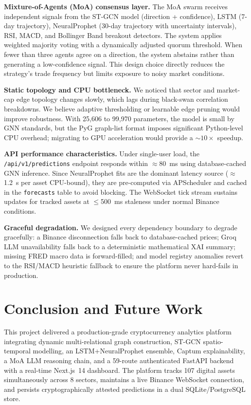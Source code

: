 \documentclass{article}
\begin{document}
\textbf{Mixture-of-Agents (MoA) consensus layer.} The MoA swarm receives independent signals from the ST-GCN model (direction + confidence), LSTM (7-day trajectory), NeuralProphet (30-day trajectory with uncertainty intervals), RSI, MACD, and Bollinger Band breakout detectors. The system applies weighted majority voting with a dynamically adjusted quorum threshold. When fewer than three agents agree on a direction, the system abstains rather than generating a low-confidence signal. This design choice directly reduces the strategy's trade frequency but limits exposure to noisy market conditions.

\textbf{Static topology and CPU bottleneck.} We noticed that sector and market-cap edge topology changes slowly, which lags during black-swan correlation breakdowns. We believe adaptive thresholding or learnable edge pruning would improve robustness. With 25,606 to 99,970 parameters, the model is small by GNN standards, but the PyG graph-list format imposes significant Python-level CPU overhead; migrating to GPU acceleration would provide a $\sim10\times$ speedup.

\textbf{API performance characteristics.} Under single-user load, the \texttt{/api/v1/predictions} endpoint responds within $\approx$80~ms using database-cached GNN inference. Since NeuralProphet fits are the dominant latency source ($\approx$1.2~s per asset CPU-bound), they are pre-computed via APScheduler and cached in the \texttt{forecasts} table to avoid blocking. The WebSocket tick stream sustains updates for tracked assets at $\le$500~ms staleness under normal Binance conditions.

\textbf{Graceful degradation.} We designed every dependency boundary to degrade gracefully: a Binance disconnection falls back to database-cached prices; Groq LLM unavailability falls back to a deterministic mathematical XAI summary; missing FRED macro data is forward-filled; and model registry anomalies revert to the RSI/MACD heuristic fallback to ensure the platform never hard-fails in production.

\section{Conclusion and Future Work}

This project delivered a production-grade cryptocurrency analytics platform integrating dynamic multi-relational graph construction, ST-GCN spatio-temporal modelling, an LSTM+NeuralProphet ensemble, Captum explainability, a MoA LLM reasoning chain, and a 59-route authenticated FastAPI backend with a real-time Next.js~14 dashboard. The platform tracks 107 digital assets simultaneously across 8 sectors, maintains a live Binance WebSocket connection, and persists cryptographically attested predictions in a dual SQLite/PostgreSQL store.
\end{document}

